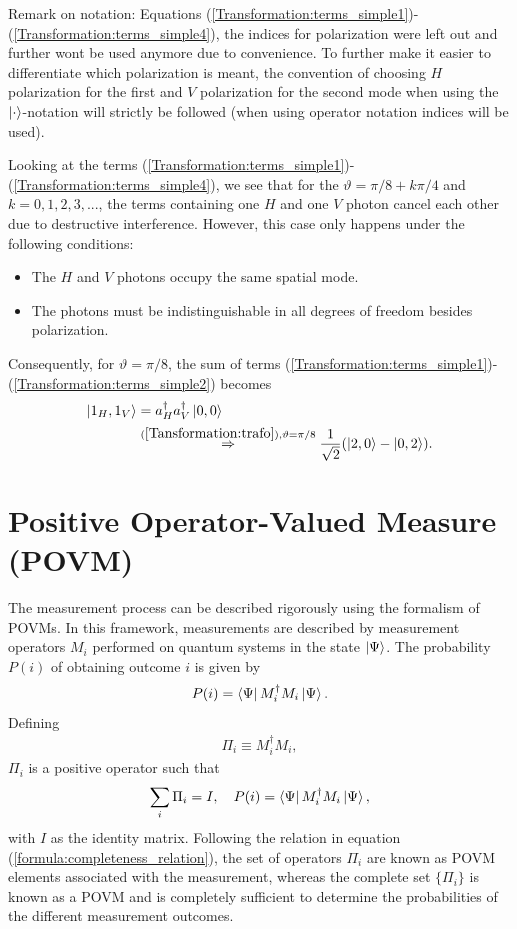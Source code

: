 \documentclass[%
 reprint,
 amsmath,amssymb,
 aps,
twocolumn
]{revtex4-2}
\begin{document}
Remark on notation: Equations (\ref{Transformation:terms_simple1})-(\ref{Transformation:terms_simple4}), the indices for polarization were left out and further wont be used anymore due to convenience. To further make it easier to differentiate which polarization is meant, the convention of choosing $H$ polarization for the first and $V$ polarization for the second mode when using the $\ket{\cdot}$-notation will strictly be followed (when using operator notation indices will be used).

Looking at the terms (\ref{Transformation:terms_simple1})-(\ref{Transformation:terms_simple4}), we see that for the $\vartheta=\pi/8+k\pi/4$ and $k=0,1,2,3,...$, the terms containing one $H$ and one $V$ photon cancel each other due to destructive interference. However, this case only happens under the following conditions:
\begin{itemize}
    \item[-] The $H$ and $V$ photons occupy the same spatial mode.
    \item[-] The photons must be indistinguishable in all degrees of freedom besides polarization.
\end{itemize}
Consequently, for $\vartheta=\pi/8$, the sum of terms (\ref{Transformation:terms_simple1})-(\ref{Transformation:terms_simple2}) becomes
\begin{align}
    \ket{1_H,1_V}&=a_H^\dagger a_V^\dagger\ket{0,0}\notag\\
    &\overset{(\ref{Tansformation:trafo}),\vartheta=\pi/8}{\Rightarrow}\dfrac{1}{\sqrt{2}}(\ket{2,0}-\ket{0,2}).
\end{align}

\section{Positive Operator-Valued Measure (POVM)}
The measurement process can be described rigorously using the formalism of POVMs. In this framework, measurements are described by measurement operators $M_i$ performed on quantum systems in the state $\ket{\Psi}$.  The probability $P(i)$ of obtaining outcome $i$ is given by
\begin{align}
    P(i) = \bra{\Psi}M^{\dagger}_iM_i\ket{\Psi}.
\end{align}
Defining
\begin{align}
    \Pi_i\equiv M^{\dagger}_iM_i,
\end{align}
$\Pi_i$ is a positive operator such that 
\begin{align}
    \sum_i \Pi_i = I, \quad P(i) = \bra{\Psi}M^{\dagger}_iM_i\ket{\Psi},\label{formula:completeness_relation}
\end{align}
with $I$ as the identity matrix. Following the relation in equation (\ref{formula:completeness_relation}), the set of operators $\Pi_i$ are known as POVM elements associated with the measurement, whereas the complete set $\{\Pi_i\}$ is known as a POVM and is completely sufficient to determine  the probabilities of the different measurement outcomes\cite[Sec.~2.2.6]{nielsen_chuang}.
\end{document}
